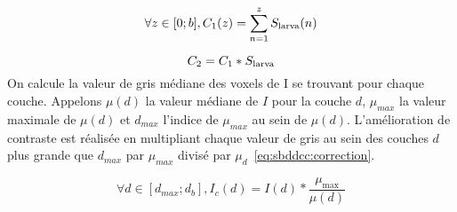 \documentclass[\main/main.tex]{subfiles}
\begin{document}
\begin{equation}
    \label{eq:sbddcc:cum_sum}
    \forall z \in [0;b], 
        C_1(z)=\sum_{n=1}^{z}S_{\textnormal{larva}}(n)
\end{equation}

\begin{equation}
    \label{eq:sbddcc:carte}
    C_2=C_1 * S_{\textnormal{larva}}
\end{equation}
%
On calcule la valeur de gris médiane des voxels de I se trouvant pour chaque couche.
%
Appelons $\mu{}(d)$ la valeur médiane de $I$ pour la couche $d$, $\mu_{max}$ la valeur maximale de $\mu{}(d)$ et $d_{max}$ l'indice de $\mu_{max}$ au sein de $\mu{}(d)$.
%
L'amélioration de contraste est réalisée en multipliant chaque valeur de gris au sein des couches $d$ plus grande que $d_{max}$ par $\mu_{max}$ divisé par $\mu_d$~\eqref{eq:sbddcc:correction}.

\begin{equation}
    \label{eq:sbddcc:correction}
    \forall d \in [d_{max};d_b],
        I_{c}(d)=I(d)*\frac{\mu_{\max}}{\mu(d)}
\end{equation}
\end{document}
